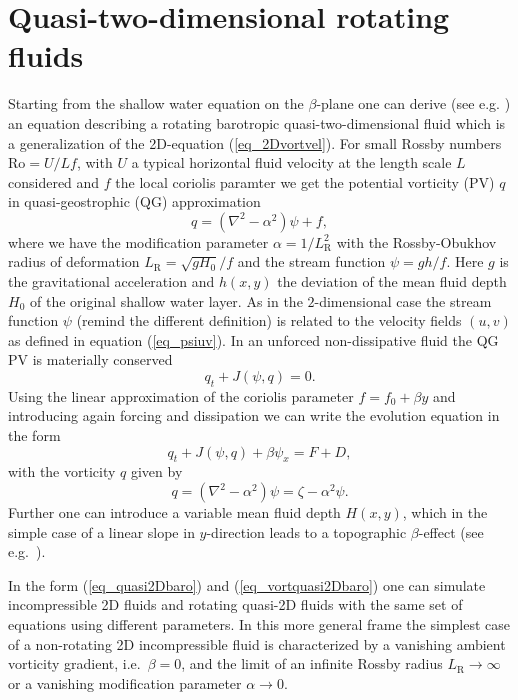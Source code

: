 \section{Quasi-two-dimensional rotating fluids}
Starting from the shallow water equation on the $\beta$-plane one can
derive (see e.g. \cite{danilovandgurarie2000}) an equation
describing a rotating barotropic quasi-two-dimensional fluid which is a
generalization of the 2D-equation (\ref{eq_2Dvortvel}). For small Rossby 
numbers $\mathrm{Ro} = U/Lf$, with $U$ a typical horizontal fluid velocity
at the length scale $L$ considered and $f$ the local coriolis paramter 
we get the potential vorticity (PV) $q$ in quasi-geostrophic (QG) approximation 
\begin{equation} \label{eq_qdef}
  q = \left( \nabla^{2}- \alpha^{2} \right) \psi + f,
\end{equation}
where we have the modification parameter $\alpha = 1/L^{2}_{\mathrm{R}}$ 
with the Rossby-Obukhov radius of deformation 
$L_{\mathrm{R}} = \sqrt{g H_{0}}/f$ and the stream function 
$\psi = gh/f$. Here $g$ is the gravitational acceleration and $h(x,y)$ 
the deviation of the mean fluid depth $H_{0}$ of the original 
shallow water layer. As in the $2$-dimensional case the stream function $\psi$ 
(remind the different definition) is related to the velocity fields $(u,v)$ 
as defined in equation (\ref{eq_psiuv}). In an unforced non-dissipative fluid
the QG PV is materially conserved
\begin{equation} 
  q_{t} + J(\psi,q) = 0. 
\end{equation}  
Using the linear approximation of the coriolis parameter $f = f_{0} + \beta y$
and introducing again forcing and dissipation we can write the evolution
equation in the form
\begin{equation} \label{eq_quasi2Dbaro}
  q_{t} + J(\psi,q) + \beta \psi_{x} = F + D,
\end{equation}
with the vorticity $q$ given by
\begin{equation} \label{eq_vortquasi2Dbaro}
  q = \left(\nabla^2 -\alpha^{2} \right) \psi 
    = \zeta - \alpha^{2} \psi.
\end{equation}
Further one can introduce a variable mean fluid depth $H(x,y)$, 
which in the simple case of a linear slope in $y$-direction leads 
to a topographic $\beta$-effect (see e.g.\ \cite{vanheist1994}). 

In the form (\ref{eq_quasi2Dbaro}) and (\ref{eq_vortquasi2Dbaro}) 
one can simulate incompressible 2D fluids and rotating quasi-2D fluids 
with the same set of equations using different parameters. 
In this more general frame the simplest case of a non-rotating
2D incompressible fluid is characterized by a vanishing 
ambient vorticity gradient, i.e.\ $\beta = 0$, and the limit of
an infinite Rossby radius $L_{\mathrm{R}} \longrightarrow \infty$
or a vanishing modification parameter $\alpha \longrightarrow 0$.

